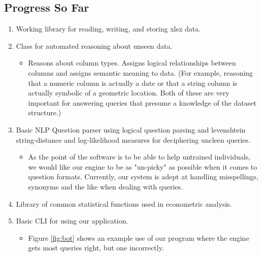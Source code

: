 \documentclass[pageno]{jpaper}
\begin{document}
\subsection{Progress So Far}
\begin{enumerate}
\item Working library for reading, writing, and storing xlsx data.
\item Class for automated reasoning about unseen data. 
\begin{itemize}
\item Reasons about column types. Assigns logical relationships between columns and assigns semantic meaning to data. (For example, reasoning that a numeric column is actually a date or that a string column is actually symbolic of a geometric location. Both of these are very important for answering queries that presume a knowledge of the dataset structure.)
\end{itemize}
\item Basic NLP Question parser using logical question parsing and levenshtein string-distance  and log-likelihood measures for deciphering uncleen queries. 
\begin{itemize}
\item As the point of the software is to be able to help untrained individuals, we would like our engine to be as "un-picky" as possible when it comes to question formats. Currently, our system is adept at handling misspellings, synonyms and the like when dealing with queries.
\end{itemize}
\item  Library of common statistical functions used in econometric analysis.
\item Basic CLI for using our application.
\begin{itemize}
\item Figure \ref{fig:bot} shows an example use of our program where the engine gets most queries right, but one incorrectly.
\end{itemize}
\end{enumerate}
\end{document}
